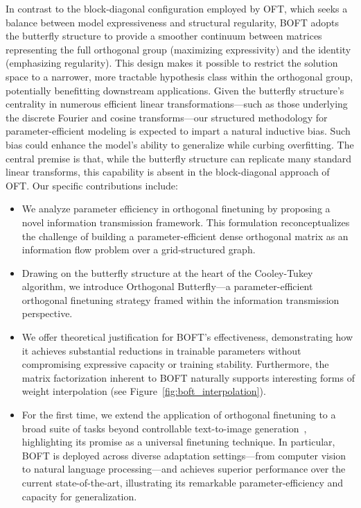 In contrast to the block-diagonal configuration employed by OFT, which seeks a balance between model expressiveness and structural regularity, BOFT adopts the butterfly structure to provide a smoother continuum between matrices representing the full orthogonal group (maximizing expressivity) and the identity (emphasizing regularity). This design makes it possible to restrict the solution space to a narrower, more tractable hypothesis class within the orthogonal group, potentially benefitting downstream applications. Given the butterfly structure's centrality in numerous efficient linear transformations—such as those underlying the discrete Fourier and cosine transforms—our structured methodology for parameter-efficient modeling is expected to impart a natural inductive bias. Such bias could enhance the model's ability to generalize while curbing overfitting. The central premise is that, while the butterfly structure can replicate many standard linear transforms, this capability is absent in the block-diagonal approach of OFT. Our specific contributions include:

\begin{itemize}[leftmargin=*,nosep]
    \item We analyze parameter efficiency in orthogonal finetuning by proposing a novel information transmission framework. This formulation reconceptualizes the challenge of building a parameter-efficient dense orthogonal matrix as an information flow problem over a grid-structured graph.
    \item Drawing on the butterfly structure at the heart of the Cooley-Tukey algorithm, we introduce Orthogonal Butterfly—a parameter-efficient orthogonal finetuning strategy framed within the information transmission perspective.
    \item We offer theoretical justification for BOFT’s effectiveness, demonstrating how it achieves substantial reductions in trainable parameters without compromising expressive capacity or training stability. Furthermore, the matrix factorization inherent to BOFT naturally supports interesting forms of weight interpolation (see Figure~\ref{fig:boft_interpolation}).
    \item For the first time, we extend the application of orthogonal finetuning to a broad suite of tasks beyond controllable text-to-image generation~\cite{qiu2023controlling}, highlighting its promise as a universal finetuning technique. In particular, BOFT is deployed across diverse adaptation settings—from computer vision to natural language processing—and achieves superior performance over the current state-of-the-art, illustrating its remarkable parameter-efficiency and capacity for generalization.
\end{itemize}

